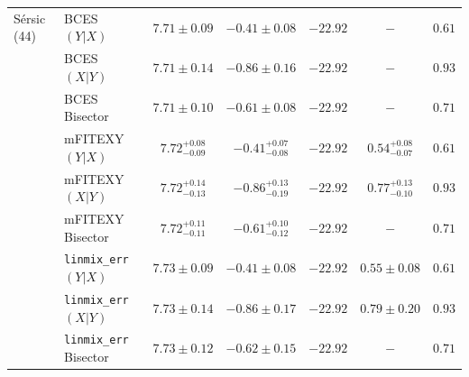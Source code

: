 \documentclass[preprint2]{emulateapj}
\begin{document}
\begin{table}
\begin{tabular}{llccccc}
S\'ersic (44) & BCES $(Y|X)$   & $7.71 \pm 0.09$ & $-0.41 \pm 0.08$ & $-22.92$ & $-$    & $0.61$ \\
              & BCES $(X|Y)$   & $7.71 \pm 0.14$ & $-0.86 \pm 0.16$ & $-22.92$ & $-$    & $0.93$ \\
              & BCES Bisector  & $7.71 \pm 0.10$  & $-0.61 \pm 0.08$ & $-22.92$ & $-$    & $0.71$ \\
              & mFITEXY $(Y|X)$   & $7.72^{+0.08}_{-0.09}$ & $-0.41^{+0.07}_{-0.08}$ & $-22.92$ & $0.54^{+0.08}_{-0.07}$ & $0.61$ \\
              & mFITEXY $(X|Y)$   & $7.72^{+0.14}_{-0.13}$ & $-0.86^{+0.13}_{-0.19}$ & $-22.92$ & $0.77^{+0.13}_{-0.10}$ & $0.93$ \\
              & mFITEXY Bisector  & $7.72^{+0.11}_{-0.11}$ & $-0.61^{+0.10}_{-0.12}$ & $-22.92$ & $-$                    & $0.71$ \\
              & {\tt linmix\_err} $(Y|X)$  & $7.73 \pm 0.09$ & $-0.41 \pm 0.08$ & $-22.92$ & $0.55 \pm 0.08$ & $0.61$ \\
              & {\tt linmix\_err} $(X|Y)$  & $7.73 \pm 0.14$ & $-0.86 \pm 0.17$ & $-22.92$ & $0.79 \pm  0.20$ & $0.93$ \\
              & {\tt linmix\_err} Bisector & $7.73 \pm 0.12$ & $-0.62 \pm 0.15$ & $-22.92$ & $-$    & $0.71$ \\ [0.5em]


\end{tabular}
\end{table}
\end{document}
